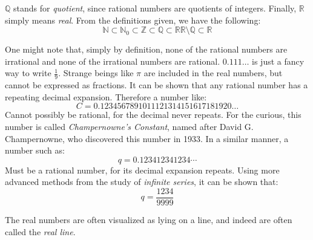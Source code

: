 \documentclass[crop=false,class=book,oneside]{standalone}
\begin{document}
        $\mathbb{Q}$ stands for \textit{quotient}, since
        rational numbers are quotients of integers. Finally,
        $\mathbb{R}$ simply means \textit{real}.
        From the definitions given, we have the
        following:
        \begin{subequations}
            \begin{equation}
                \mathbb{N}
                \subset\mathbb{N}_{0}
                \subset\mathbb{Z}
                \subset\mathbb{Q}
                \subset\mathbb{R}
            \end{equation}
            \begin{equation}
                \mathbb{R}\setminus\mathbb{Q}
                \subset\mathbb{R}
            \end{equation}
        \end{subequations}
        \begin{remark}
            One might note that, simply by definition, none of the
            rational numbers are irrational and none of the
            irrational numbers are rational.
            $0.111\hdots$ is just a fancy way to write $\frac{1}{9}$.
            Strange beings like $\pi$ are included in the real numbers,
            but cannot be expressed as fractions. It can be shown that
            any rational number has a repeating decimal expansion.
            Therefore a number like:
            \begin{equation}
                C=0.1234567891011121314151617181920\dots
            \end{equation}
            Cannot possibly be rational, for the decimal never repeats.
            For the curious, this number is called
            \textit{Champernowne's Constant}, named after David
            G. Champernowne, who discovered this number in 1933.
            In a similar manner, a number such as:
            \begin{equation}
                q=0.123412341234\cdots
            \end{equation}
            Must be a rational number, for its decimal expansion
            repeats. Using more advanced methods from the study
            of \textit{infinite series}, it can be shown that:
            \begin{equation}
                q=\frac{1234}{9999}
            \end{equation}
        \end{remark}
        The real numbers are often visualized as lying on a
        line, and indeed are often called the \textit{real line}.
\end{document}
